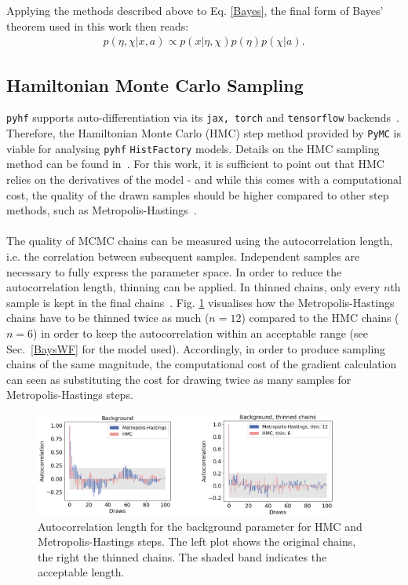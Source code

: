 \noindent Applying the methods described above to Eq. \eqref{Bayes}, the final form of Bayes' theorem used in this work then reads:
    \begin{align} \label{BayesConj_final}
        p(\eta, \chi \vert x, a) \propto p(x\vert \eta, \chi) p(\eta) p(\chi | a).
    \end{align}


\subsection{Hamiltonian Monte Carlo Sampling}
\texttt{pyhf} supports auto-differentiation via its \texttt{jax, torch} and \texttt{tensorflow} backends~\cite{pyhf, pyhf_joss, jax2018github, tensorflow2015-whitepaper, paszke2017automatic}. Therefore, the Hamiltonian Monte Carlo (HMC) step method provided by \texttt{PyMC} is viable for analysing \texttt{pyhf} \texttt{HistFactory} models. Details on the HMC sampling method can be found in~\cite{vishnoi2021introduction}. For this work, it is sufficient to point out that HMC relies on the derivatives of the model - and while this comes with a computational cost, the quality of the drawn samples should be higher compared to other step methods, such as Metropolis-Hastings~\cite{Metropolis1953}. \\ \\
\noindent The quality of MCMC chains can be measured using the autocorrelation length, i.e. the correlation between subsequent samples. Independent samples are necessary to fully express the parameter space. In order to reduce the autocorrelation length, thinning can be applied. In thinned chains, only every $n$th sample is kept in the final chains~\cite{hoyer2017xarray}. Fig. \ref{autocorr} visualises how the Metropolis-Hastings chains have to be thinned twice as much ($n=12$) compared to the HMC chains ($n=6$) in order to keep the autocorrelation within an acceptable range (see Sec.~\ref{BaysWF} for the model used). Accordingly, in order to produce sampling chains of the same magnitude, the computational cost of the gradient calculation can seen as substituting the cost for drawing twice as many samples for Metropolis-Hastings steps.
    \begin{figure}%
        \centering
        \includegraphics[width=10cm]{figures/autocorr.png}
        \centering
        \caption{Autocorrelation length for the background parameter for HMC and Metropolis-Hastings steps. The left plot shows the original chains, the right the thinned chains. The shaded band indicates the acceptable length.}
        \label{autocorr}
    \end{figure}
